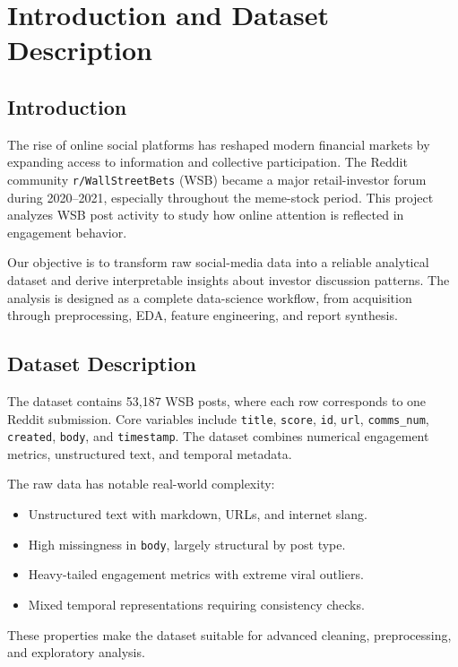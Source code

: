 \section{Introduction and Dataset Description}

\subsection{Introduction}
The rise of online social platforms has reshaped modern financial markets by expanding access to information and collective participation. The Reddit community \texttt{r/WallStreetBets} (WSB) became a major retail-investor forum during 2020--2021, especially throughout the meme-stock period. This project analyzes WSB post activity to study how online attention is reflected in engagement behavior.

Our objective is to transform raw social-media data into a reliable analytical dataset and derive interpretable insights about investor discussion patterns. The analysis is designed as a complete data-science workflow, from acquisition through preprocessing, EDA, feature engineering, and report synthesis.

\subsection{Dataset Description}
The dataset contains 53,187 WSB posts, where each row corresponds to one Reddit submission. Core variables include \texttt{title}, \texttt{score}, \texttt{id}, \texttt{url}, \texttt{comms\_num}, \texttt{created}, \texttt{body}, and \texttt{timestamp}. The dataset combines numerical engagement metrics, unstructured text, and temporal metadata.

The raw data has notable real-world complexity:
\begin{itemize}
  \item Unstructured text with markdown, URLs, and internet slang.
  \item High missingness in \texttt{body}, largely structural by post type.
  \item Heavy-tailed engagement metrics with extreme viral outliers.
  \item Mixed temporal representations requiring consistency checks.
\end{itemize}

These properties make the dataset suitable for advanced cleaning, preprocessing, and exploratory analysis.
